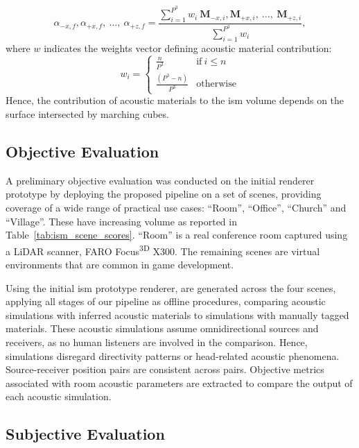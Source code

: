 \begin{equation}
    \alpha_{-x,f}, \alpha_{+x,f},~\dots,~\alpha_{+z,f} = \frac{ \sum_{i=1}^{P^3} w_i~\mathbf{M}_{-x,i}, \mathbf{M}_{+x,i},~\dots,~\mathbf{M}_{+z,i} }{ \sum_{i = 1}^{P^3} w_i},
\label{eq:weighted_average}
\end{equation}
where $w$ indicates the weights vector defining acoustic material contribution: 
\begin{equation}
    w_i = \begin{cases}
        \frac{n}{P^3}& \text{if}~i \leq n \\
        \frac{(P^3 - n)}{P^3}& \text{otherwise}
    \end{cases}
\label{eq:patch_contribution}
\end{equation}
Hence, the contribution of acoustic materials to the \acrshort{ism} volume depends on the surface intersected by marching cubes.

\subsection{Objective Evaluation}
A preliminary objective evaluation was conducted on the initial renderer prototype by deploying the proposed pipeline on a set of scenes, providing coverage of a wide range of practical use cases: ``Room'', ``Office'', ``Church'' and ``Village''. These have increasing volume as reported in Table~\ref{tab:ism_scene_scores}. ``Room'' is a real conference room captured using a LiDAR scanner, FARO Focus\textsuperscript{3D} X300. The remaining scenes are virtual environments that are common in game development. \par
Using the initial \acrshort{ism} prototype renderer,  are generated across the four scenes, applying all stages of our pipeline as offline procedures, comparing acoustic simulations with inferred acoustic materials to simulations with manually tagged materials. These acoustic simulations assume omnidirectional sources and receivers, as no human listeners are involved in the comparison. Hence, simulations disregard directivity patterns or head-related acoustic phenomena. Source-receiver position pairs are consistent across  pairs. Objective metrics associated with room acoustic parameters are extracted to compare the output of each acoustic simulation.\par

\subsection{Subjective Evaluation}
